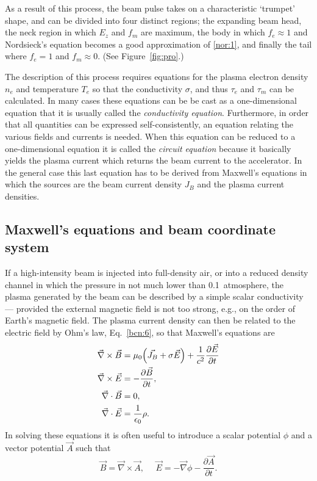 \documentclass [12pt,a4paper,     ]{report} %
\begin{document}
	As a result of this process, the beam pulse takes on a characteristic `trumpet' shape, and can be divided into four distinct regions; the expanding beam head, the neck region in which $E_z$ and $f_m$ are maximum, the body in which $f_e \approx 1$ and Nordsieck's equation becomes a good approximation of \eqref{nor:1}, and finally the tail where $f_e=1$ and $f_m \approx 0$.  (See Figure~\ref{fig:pro}.)

	The description of this process requires equations for the plasma electron density $n_e$ and temperature $T_e$ so that the conductivity $\sigma$, and thus $\tau_e$ and $\tau_m$ can be calculated.  In many cases these equations can be be cast as a one-dimensional equation that it is usually called the \emph{conductivity equation}. Furthermore, in order that all quantities can be expressed self-consistently, an equation relating the various fields and currents is needed.  When this equation can be reduced to a one-dimensional equation it is called the \emph{circuit equation} because it basically yields the plasma current which returns the beam current to the accelerator.  In the general case this last equation has to be derived from Maxwell's equations in which the sources are the beam current density $J_B$ and the plasma current densities.

\subsection{Maxwell's equations and beam coordinate system}


   If a high-intensity beam is injected into full-density air, or into a reduced density channel in which the pressure in not much lower than 0.1~atmosphere, the plasma generated by the beam can be described by a simple scalar conductivity --- provided the external magnetic field is not too strong, e.g., on the order of Earth's magnetic field.  The plasma current density can then be related to the electric field by Ohm's law, Eq.~\eqref{bcn:6}, so that Maxwell's equations are
%
\begin{align}\label{pla:1} %
   \vec{\nabla} \times \vec{B} & = \mu_0 \Bigl( \vec{J_B} + \sigma\vec{E} \Bigr)
                     + \frac{1}{c^2} \frac{\partial \vec{E}}{\partial t} \\
   \vec{\nabla} \times \vec{E} & = - \frac{\partial \vec{B}}{\partial t}, \\
   \vec{\nabla} \cdot  \vec{B} & =  0,   \\
   \vec{\nabla} \cdot  \vec{E} & = \frac{1}{\epsilon_0} \rho.
\end{align}
%
In solving these equations it is often useful to introduce a scalar potential $\phi$ and a vector potential $\vec{A}$ such that
%
\begin{equation}\label{pla:2} %
            \vec{B} =  \vec{\nabla} \times \vec{A}, ~~~  ~~~
            \vec{E} = -\vec{\nabla} \phi - \frac{\partial \vec{A}}{\partial t}.
\end{equation}
%
\end{document}
